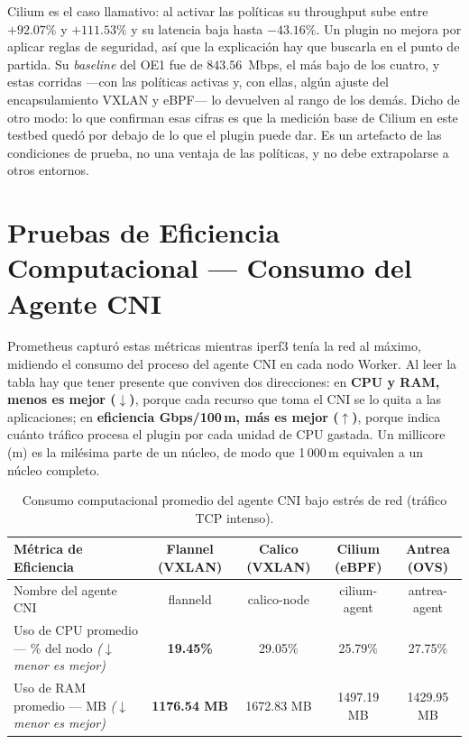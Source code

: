 Cilium es el caso llamativo: al activar las políticas su throughput sube entre $+92.07\%$ y $+111.53\%$ y su latencia baja hasta $-43.16\%$. Un plugin no mejora por aplicar reglas de seguridad, así que la explicación hay que buscarla en el punto de partida. Su \emph{baseline} del OE1 fue de $843.56$~Mbps, el más bajo de los cuatro, y estas corridas ---con las políticas activas y, con ellas, algún ajuste del encapsulamiento VXLAN y eBPF--- lo devuelven al rango de los demás. Dicho de otro modo: lo que confirman esas cifras es que la medición base de Cilium en este testbed quedó por debajo de lo que el plugin puede dar. Es un artefacto de las condiciones de prueba, no una ventaja de las políticas, y no debe extrapolarse a otros entornos.


\section{Pruebas de Eficiencia Computacional --- Consumo del Agente CNI}

Prometheus capturó estas métricas mientras iperf3 tenía la red al máximo, midiendo el consumo del proceso del agente CNI en cada nodo Worker. Al leer la tabla hay que tener presente que conviven dos direcciones: en \textbf{CPU y RAM, menos es mejor ($\downarrow$)}, porque cada recurso que toma el CNI se lo quita a las aplicaciones; en \textbf{eficiencia Gbps/100\,m, más es mejor ($\uparrow$)}, porque indica cuánto tráfico procesa el plugin por cada unidad de CPU gastada. Un millicore (m) es la milésima parte de un núcleo, de modo que 1\,000\,m equivalen a un núcleo completo.

\begin{table}[htbp]
\centering
\scriptsize
\caption{Consumo computacional promedio del agente CNI bajo estrés de red (tráfico TCP intenso).}
\label{tab:consumo-recursos}
\begin{tabularx}{\textwidth}{|Y|c|c|c|c|}
\hline
\textbf{Métrica de Eficiencia} & \textbf{Flannel (VXLAN)} & \textbf{Calico (VXLAN)} & \textbf{Cilium (eBPF)} & \textbf{Antrea (OVS)} \\
\hline
Nombre del agente CNI & flanneld & calico-node & cilium-agent & antrea-agent \\
\hline
Uso de CPU promedio --- \% del nodo \newline\textit{($\downarrow$ menor es mejor)} & \textbf{19.45\%} & 29.05\% & 25.79\% & 27.75\% \\
\hline
Uso de RAM promedio --- MB \newline\textit{($\downarrow$ menor es mejor)} & \textbf{1176.54 MB} & 1672.83 MB & 1497.19 MB & 1429.95 MB \\
\hline
\end{tabularx}
\end{table}

